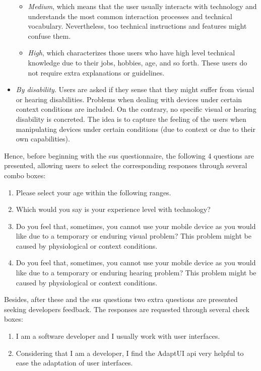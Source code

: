 \begin{itemize}
\begin{itemize}
    \item \textit{Medium}, which means that the user usually interacts with 
    technology and understands the most common interaction processes and technical 
    vocabulary. Nevertheless, too technical instructions and features might 
    confuse them.
    
    \item \textit{High}, which characterizes those users who have high level 
    technical knowledge due to their jobs, hobbies, age, and so forth. These 
    users do not require extra explanations or guidelines.
  \end{itemize}
  
  \item \textit{By disability}. Users are asked if they sense that they might 
  suffer from visual or hearing disabilities. Problems when dealing with devices 
  under certain context conditions are included. On the contrary, no specific 
  visual or hearing disability is concreted. The idea is to capture the feeling 
  of the users when manipulating devices under certain conditions (due to context 
  or due to their own capabilities).
\end{itemize}

Hence, before beginning with the \ac{sus} questionnaire, the following 4 questions
are presented, allowing users to select the corresponding responses through
several combo boxes:

\begin{enumerate}[label=\alph*)]
  \item Please select your age within the following ranges.
  \item Which would you say is your experience level with technology?
  \item Do you feel that, sometimes, you cannot use your mobile device as you
  would like due to a temporary or enduring visual problem? This problem might
  be caused by physiological or context conditions.
  \item Do you feel that, sometimes, you cannot use your mobile device as you
  would like due to a temporary or enduring hearing problem? This problem might
  be caused by physiological or context conditions.
\end{enumerate}

Besides, after these and the \ac{sus} questions two extra questions are presented
seeking developers feedback. The responses are requested through several check 
boxes:

\begin{enumerate}[label=\alph*)]
  \item I am a software developer and I usually work with user interfaces.
  \item Considering that I am a developer, I find the AdaptUI \ac{api} very
  helpful to ease the adaptation of user interfaces.
\end{enumerate}


